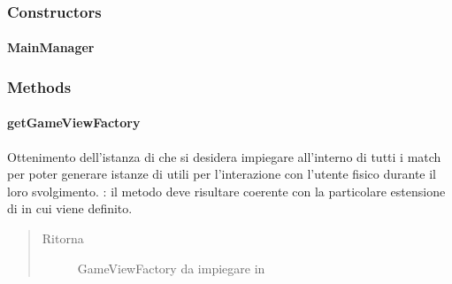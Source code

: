 \documentclass[letterpaper,10pt,italian,openany,oneside]{sphinxmanual}
\begin{document}
\subsubsection{Constructors}
\label{\detokenize{source/it/unicam/cs/pa/mastermind/gamecore/MainManager:constructors}}

\paragraph{MainManager}
\label{\detokenize{source/it/unicam/cs/pa/mastermind/gamecore/MainManager:id1}}

\begin{fulllineitems}
\label{\detokenize{source/it/unicam/cs/pa/mastermind/gamecore/MainManager:it.unicam.cs.pa.mastermind.gamecore.MainManager.MainManager()}}
\end{fulllineitems}



\subsubsection{Methods}
\label{\detokenize{source/it/unicam/cs/pa/mastermind/gamecore/MainManager:methods}}

\paragraph{getGameViewFactory}
\label{\detokenize{source/it/unicam/cs/pa/mastermind/gamecore/MainManager:getgameviewfactory}}

\begin{fulllineitems}
\label{\detokenize{source/it/unicam/cs/pa/mastermind/gamecore/MainManager:it.unicam.cs.pa.mastermind.gamecore.MainManager.getGameViewFactory()}}
Ottenimento dell’istanza di  che si desidera impiegare all’interno di tutti i match per poter generare istanze di  utili per l’interazione con l’utente fisico durante il loro svolgimento. : il metodo deve risultare coerente con la particolare estensione di  in cui viene definito.
\begin{quote}\begin{description}
\item[{Ritorna}] \leavevmode
GameViewFactory da impiegare in 

\end{description}\end{quote}

\end{fulllineitems}
\end{document}
